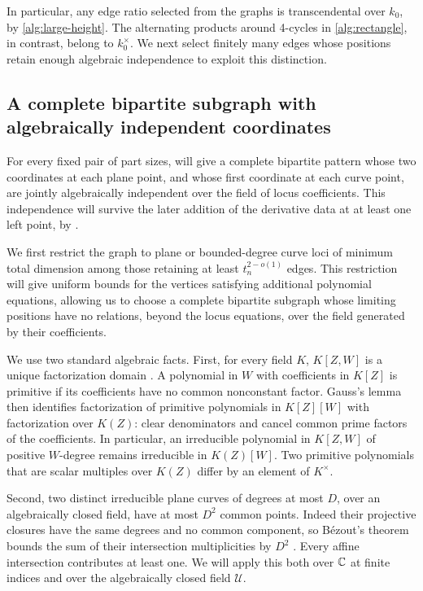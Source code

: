 In particular, any edge ratio selected from the graphs is transcendental
over \(k_0\), by \eqref{alg:large-height}. The alternating products around 4-cycles in
\eqref{alg:rectangle}, in contrast, belong to \(k_0^\times\). We next
select finitely many edges whose positions retain enough algebraic
independence to exploit this distinction.

\subsection{A complete bipartite subgraph with algebraically independent coordinates}

For every fixed pair of part sizes,  will give a complete
bipartite pattern whose two coordinates at each plane point, and whose
first coordinate at each curve point, are jointly algebraically
independent over the field of locus coefficients. This independence
will survive the later addition of the derivative data at at least
one left point, by .


We first restrict the graph to plane or bounded-degree curve loci of
minimum total dimension among those retaining at least \(t_n^{2-o(1)}\) edges. This
restriction will give uniform bounds for the vertices satisfying additional
polynomial equations, allowing us to choose a complete bipartite subgraph whose limiting
positions have no relations, beyond the locus equations, over the field
generated by their coefficients.

We use two standard algebraic facts. First, for every field \(K\),
\(K[Z,W]\) is a unique factorization domain
\cite[Lemma~10.120.10]{stacksUFD}. A polynomial in \(W\) with
coefficients in \(K[Z]\) is primitive if its coefficients have no
common nonconstant factor. Gauss's lemma then identifies
factorization of primitive polynomials in \(K[Z][W]\) with
factorization over \(K(Z)\): clear denominators and cancel common
prime factors of the coefficients. In particular, an irreducible
polynomial in \(K[Z,W]\) of positive \(W\)-degree remains irreducible in
\(K(Z)[W]\). Two primitive polynomials that are scalar multiples
over \(K(Z)\) differ by an element of \(K^\times\).

Second, two distinct irreducible plane curves of degrees at most
\(D\), over an algebraically closed field, have at most \(D^2\)
common points. Indeed their projective closures have the same degrees
and no common component, so B\'ezout's theorem bounds the sum of their
intersection multiplicities by \(D^2\)
\cite[Section~5.3]{fultonCurves}. Every affine intersection contributes
at least one. We will apply this both over \(\mathbb C\) at finite indices
and over the algebraically closed field \(\mathcal U\).

